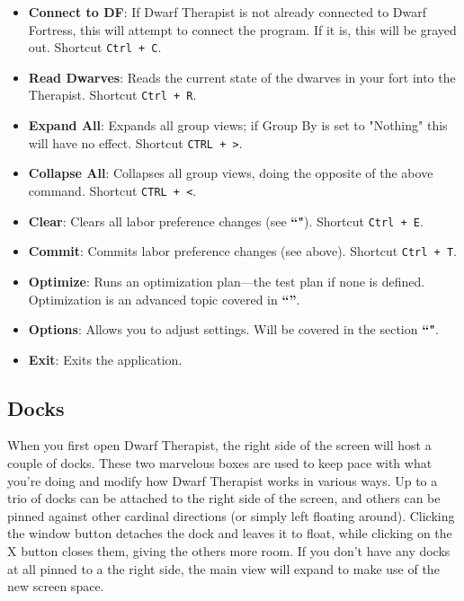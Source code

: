 \documentclass[]{article}
\begin{document}
\parbox[]{1\textwidth}{}
\begin{itemize}
\item \textbf{Connect to DF}: If Dwarf Therapist is not already connected to Dwarf Fortress, this will
attempt to connect the program. If it is, this will be grayed out. Shortcut \texttt{Ctrl + C}.
\item \textbf{Read Dwarves}: Reads the current state of the dwarves in your fort into the Therapist.
Shortcut \texttt{Ctrl + R}.
\item \textbf{Expand All}: Expands all group views; if Group By is set to "Nothing" this will have no
effect. Shortcut \texttt{CTRL + >}.
\item \textbf{Collapse All}: Collapses all group views, doing the opposite of the above command. Shortcut
\texttt{CTRL + <}.
\item \textbf{Clear}: Clears all labor preference changes (see \textbf{``"}). Shortcut \texttt{Ctrl + E}.
\item \textbf{Commit}: Commits labor preference changes (see above). Shortcut \texttt{Ctrl + T}.
\item \textbf{Optimize}: Runs an optimization plan---the test plan if none is defined. Optimization is an
advanced topic covered in \textbf{``''}.
\item \textbf{Options}: Allows you to adjust settings. Will be covered in the section
\textbf{``"}.
\item \textbf{Exit}: Exits the application.

\end{itemize}

\newpage
\subsection{Docks}
\label{sec:Docks}

When you first open Dwarf Therapist, the right side of the screen will host a couple of docks. These two
marvelous boxes are used to keep pace with what you're doing and modify how Dwarf Therapist works in
various ways. Up to a trio of docks can be attached to the right side of the screen, and others can be
pinned against other cardinal directions (or simply left floating around). Clicking the window button
detaches the dock and leaves it to float, while clicking on the X button closes them, giving the others
more room. If you don't have any docks at all pinned to a the right side, the main view will expand to
make use of the new screen space.
\end{document}
